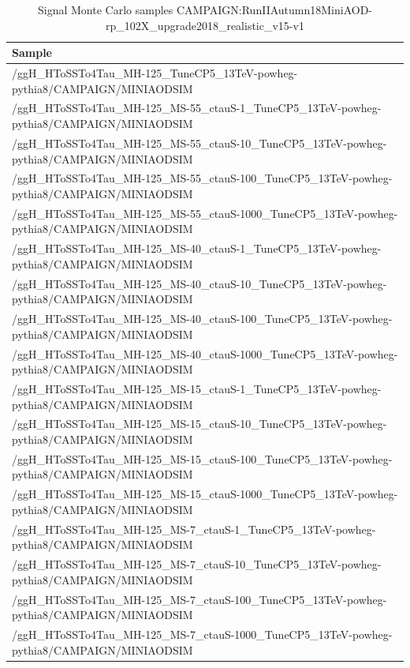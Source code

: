 \begin{table}[htb]
  \begin{center}
    \scriptsize
    \begin{tabular}{l}\hline
      Sample \\
      \hline
      /ggH\_HToSSTo4Tau\_MH-125\_TuneCP5\_13TeV-powheg-pythia8/CAMPAIGN/MINIAODSIM\\
      \hline
      /ggH\_HToSSTo4Tau\_MH-125\_MS-55\_ctauS-1\_TuneCP5\_13TeV-powheg-pythia8/CAMPAIGN/MINIAODSIM\\
      /ggH\_HToSSTo4Tau\_MH-125\_MS-55\_ctauS-10\_TuneCP5\_13TeV-powheg-pythia8/CAMPAIGN/MINIAODSIM\\
      /ggH\_HToSSTo4Tau\_MH-125\_MS-55\_ctauS-100\_TuneCP5\_13TeV-powheg-pythia8/CAMPAIGN/MINIAODSIM\\
      /ggH\_HToSSTo4Tau\_MH-125\_MS-55\_ctauS-1000\_TuneCP5\_13TeV-powheg-pythia8/CAMPAIGN/MINIAODSIM\\
      /ggH\_HToSSTo4Tau\_MH-125\_MS-40\_ctauS-1\_TuneCP5\_13TeV-powheg-pythia8/CAMPAIGN/MINIAODSIM\\
      /ggH\_HToSSTo4Tau\_MH-125\_MS-40\_ctauS-10\_TuneCP5\_13TeV-powheg-pythia8/CAMPAIGN/MINIAODSIM\\
      /ggH\_HToSSTo4Tau\_MH-125\_MS-40\_ctauS-100\_TuneCP5\_13TeV-powheg-pythia8/CAMPAIGN/MINIAODSIM\\
      /ggH\_HToSSTo4Tau\_MH-125\_MS-40\_ctauS-1000\_TuneCP5\_13TeV-powheg-pythia8/CAMPAIGN/MINIAODSIM\\
      /ggH\_HToSSTo4Tau\_MH-125\_MS-15\_ctauS-1\_TuneCP5\_13TeV-powheg-pythia8/CAMPAIGN/MINIAODSIM\\
      /ggH\_HToSSTo4Tau\_MH-125\_MS-15\_ctauS-10\_TuneCP5\_13TeV-powheg-pythia8/CAMPAIGN/MINIAODSIM\\
      /ggH\_HToSSTo4Tau\_MH-125\_MS-15\_ctauS-100\_TuneCP5\_13TeV-powheg-pythia8/CAMPAIGN/MINIAODSIM\\
      /ggH\_HToSSTo4Tau\_MH-125\_MS-15\_ctauS-1000\_TuneCP5\_13TeV-powheg-pythia8/CAMPAIGN/MINIAODSIM\\
      /ggH\_HToSSTo4Tau\_MH-125\_MS-7\_ctauS-1\_TuneCP5\_13TeV-powheg-pythia8/CAMPAIGN/MINIAODSIM\\
      /ggH\_HToSSTo4Tau\_MH-125\_MS-7\_ctauS-10\_TuneCP5\_13TeV-powheg-pythia8/CAMPAIGN/MINIAODSIM\\
      /ggH\_HToSSTo4Tau\_MH-125\_MS-7\_ctauS-100\_TuneCP5\_13TeV-powheg-pythia8/CAMPAIGN/MINIAODSIM\\
      /ggH\_HToSSTo4Tau\_MH-125\_MS-7\_ctauS-1000\_TuneCP5\_13TeV-powheg-pythia8/CAMPAIGN/MINIAODSIM\\
      \hline
    \end{tabular}
    \label{tab:sigsample}
  \end{center}
  \caption{Signal Monte Carlo samples \newline CAMPAIGN:RunIIAutumn18MiniAOD-rp\_102X\_upgrade2018\_realistic\_v15-v1}
\end{table}




